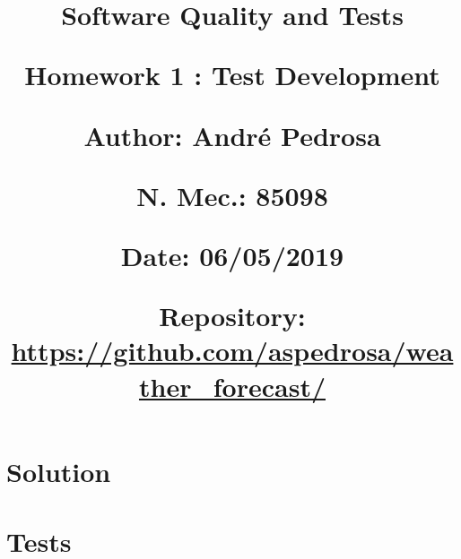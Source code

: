 \documentclass[12pt]{article}
\begin{document}
\title{\vspace{-0.9cm}
       \Large\raggedright\textbf{Software Quality and Tests} \\ 
       \large\raggedright\textbf{Homework 1 : Test Development} \\ 
       \vspace{0.5cm}
       \normalsize
       \raggedright\textbf{Author: \hspace{1.1cm} André Pedrosa} \\ \vspace{0.1cm}
       \raggedright\textbf{N. Mec.: \hspace{0.92cm} 85098} \\ \vspace{0.1cm}
       \raggedright\textbf{Date: \hspace{1.6cm} 06/05/2019} \\ \vspace{0.1cm}
       \raggedright\textbf{Repository: \hspace{0.35cm} \url{https://github.com/aspedrosa/weather\_forecast/}} \\}
\author{}
\date{}

\maketitle
\thispagestyle{fancy}

\vspace{-1.4cm}

\tableofcontents

\newpage

\section{Solution}
\section{Tests}
\end{document}
